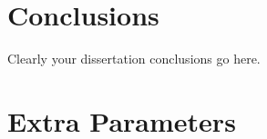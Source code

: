 \documentclass[
reprint,
amsmath,amssymb,
aip,
jap,
floatfix,
]{revtex4-2}
\begin{document}
\chapter{Conclusions}
\label{chapter:dissconclusion}
Clearly your dissertation conclusions go here. 


\appendix %

\chapter{Extra Parameters}\label{appendixextraparams}
% 





\end{document}
